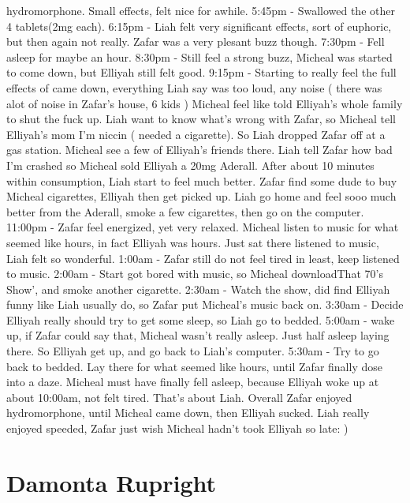 \documentclass[12pt]{book}
\begin{document}
hydromorphone. Small effects, felt nice for awhile. 5:45pm - Swallowed the other 4 tablets(2mg each). 6:15pm - Liah felt very significant effects, sort of euphoric, but then again not really. Zafar was a very plesant buzz though. 7:30pm - Fell asleep for maybe an hour. 8:30pm - Still feel a strong buzz, Micheal was started to come down, but Elliyah still felt good. 9:15pm - Starting to really feel the full effects of came down, everything Liah say was too loud, any noise ( there was alot of noise in Zafar's house, 6 kids ) Micheal feel like told Elliyah's whole family to shut the fuck up. Liah want to know what's wrong with Zafar, so Micheal tell Elliyah's mom I'm niccin ( needed a cigarette). So Liah dropped Zafar off at a gas station. Micheal see a few of Elliyah's friends there. Liah tell Zafar how bad I'm crashed so Micheal sold Elliyah a 20mg Aderall. After about 10 minutes within consumption, Liah start to feel much better. Zafar find some dude to buy Micheal cigarettes, Elliyah then get picked up. Liah go home and feel sooo much better from the Aderall, smoke a few cigarettes, then go on the computer. 11:00pm - Zafar feel energized, yet very relaxed. Micheal listen to music for what seemed like hours, in fact Elliyah was hours. Just sat there listened to music, Liah felt so wonderful. 1:00am - Zafar still do not feel tired in least, keep listened to music. 2:00am - Start got bored with music, so Micheal downloadThat 70's Show', and smoke another cigarette. 2:30am - Watch the show, did find Elliyah funny like Liah usually do, so Zafar put Micheal's music back on. 3:30am - Decide Elliyah really should try to get some sleep, so Liah go to bedded. 5:00am - wake up, if Zafar could say that, Micheal wasn't really asleep. Just half asleep laying there. So Elliyah get up, and go back to Liah's computer. 5:30am - Try to go back to bedded. Lay there for what seemed like hours, until Zafar finally dose into a daze. Micheal must have finally fell asleep, because Elliyah woke up at about 10:00am, not felt tired. That's about Liah. Overall Zafar enjoyed hydromorphone, until Micheal came down, then Elliyah sucked. Liah really enjoyed speeded, Zafar just wish Micheal hadn't took Elliyah so late: )



\chapter{Damonta Rupright}
\end{document}
